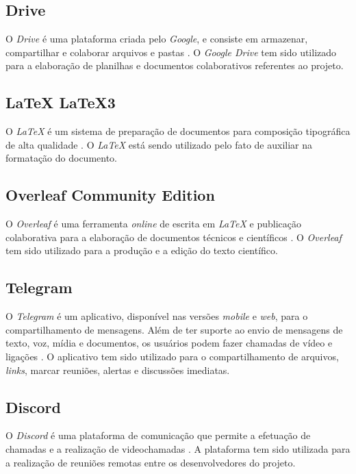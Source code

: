 \label{tec_apoio_pesquisa_comunicacao}

\subsection{Drive}
O \textit{Drive} é uma plataforma criada pelo \textit{Google}, e consiste em armazenar, compartilhar e colaborar arquivos e pastas \cite{drive}. O \textit{Google Drive} tem sido utilizado para a elaboração de planilhas e documentos colaborativos referentes ao projeto.

\subsection{LaTeX LaTeX3}
O \textit{LaTeX} é um sistema de preparação de documentos para composição tipográfica de alta qualidade \cite{latex}. O \textit{LaTeX} está sendo utilizado pelo fato de auxiliar na formatação do documento.

\subsection{Overleaf Community Edition}
O \textit{Overleaf} é uma ferramenta \textit{online} de escrita em \textit{LaTeX} e publicação colaborativa para a elaboração de documentos técnicos e científicos \cite{overleaf}. O \textit{Overleaf} tem sido utilizado para a produção e a edição do texto científico.

\subsection{Telegram}
O \textit{Telegram} é um aplicativo, disponível nas versões \textit{mobile} e \textit{web}, para o compartilhamento de mensagens. Além de ter suporte ao envio de mensagens de texto, voz, mídia e documentos, os usuários podem fazer chamadas de vídeo e ligações \cite{telegram}. O aplicativo tem sido utilizado para o compartilhamento de arquivos, \textit{links}, marcar reuniões, alertas e discussões imediatas.

\subsection{Discord}
O \textit{Discord} é uma plataforma de comunicação que permite a efetuação de chamadas e a realização de videochamadas \cite{discord}. A plataforma tem sido utilizada para a realização de reuniões remotas entre os desenvolvedores do projeto.

